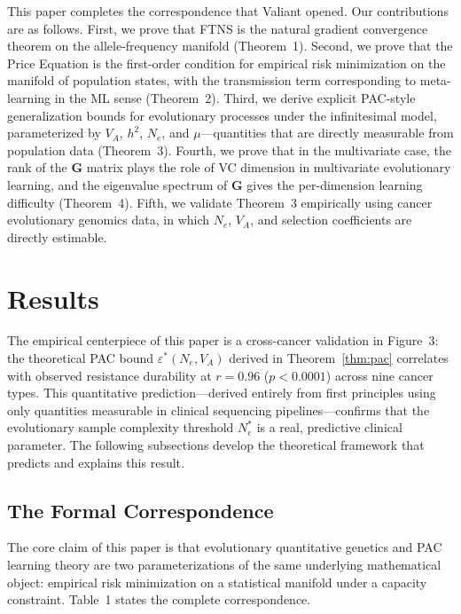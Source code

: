 \documentclass[12pt]{article}
\theoremstyle{remark}
\begin{document}
This paper completes the correspondence that Valiant opened. Our contributions are as follows. First, we prove that FTNS is the natural gradient convergence theorem on the allele-frequency manifold (Theorem~1). Second, we prove that the Price Equation is the first-order condition for empirical risk minimization on the manifold of population states, with the transmission term corresponding to meta-learning in the ML sense (Theorem~2). Third, we derive explicit PAC-style generalization bounds for evolutionary processes under the infinitesimal model, parameterized by $V_A$, $h^2$, $N_e$, and $\mu$---quantities that are directly measurable from population data (Theorem~3). Fourth, we prove that in the multivariate case, the rank of the $\mathbf{G}$ matrix plays the role of VC dimension in multivariate evolutionary learning, and the eigenvalue spectrum of $\mathbf{G}$ gives the per-dimension learning difficulty (Theorem~4). Fifth, we validate Theorem~3 empirically using cancer evolutionary genomics data, in which $N_e$, $V_A$, and selection coefficients are directly estimable.

\section{Results}

The empirical centerpiece of this paper is a cross-cancer validation in Figure~3: the theoretical PAC bound $\varepsilon^*(N_e, V_A)$ derived in Theorem~\ref{thm:pac} correlates with observed resistance durability at $r = 0.96$ ($p < 0.0001$) across nine cancer types. This quantitative prediction---derived entirely from first principles using only quantities measurable in clinical sequencing pipelines---confirms that the evolutionary sample complexity threshold $N_e^*$ is a real, predictive clinical parameter. The following subsections develop the theoretical framework that predicts and explains this result.

\subsection{The Formal Correspondence}

The core claim of this paper is that evolutionary quantitative genetics and PAC learning theory are two parameterizations of the same underlying mathematical object: empirical risk minimization on a statistical manifold under a capacity constraint. Table~1 states the complete correspondence.
\end{document}
